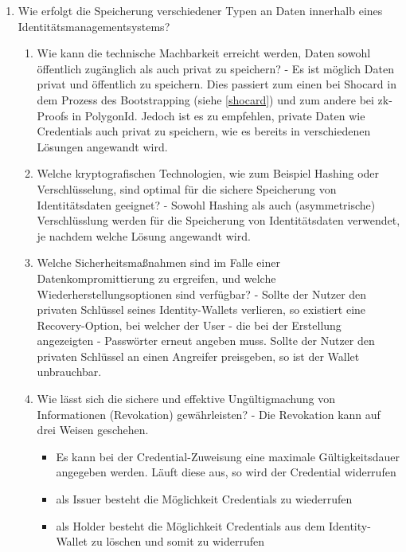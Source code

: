 \begin{enumerate}
	\item Wie erfolgt die Speicherung verschiedener Typen an Daten innerhalb eines Identitätsmanagementsystems?
	\begin{enumerate}
		\item Wie kann die technische Machbarkeit erreicht werden, Daten sowohl öffentlich zugänglich als auch privat zu speichern? - Es ist möglich Daten privat und öffentlich zu speichern. Dies passiert zum einen bei Shocard in dem Prozess des Bootstrapping (siehe \ref{shocard}) und zum andere bei zk-Proofs in PolygonId. Jedoch ist es zu empfehlen, private Daten wie Credentials auch privat zu speichern, wie es bereits in verschiedenen Lösungen angewandt wird.
		
		\item Welche kryptografischen Technologien, wie zum Beispiel Hashing oder Verschlüsselung, sind optimal für die sichere Speicherung von Identitätsdaten geeignet? - Sowohl Hashing als auch (asymmetrische) Verschlüsslung werden für die Speicherung von Identitätsdaten verwendet, je nachdem welche Lösung angewandt wird.
		
		 
		\item Welche Sicherheitsmaßnahmen sind im Falle einer Datenkompromittierung zu ergreifen, und welche Wiederherstellungsoptionen sind verfügbar? - Sollte der Nutzer den privaten Schlüssel seines Identity-Wallets verlieren, so existiert eine Recovery-Option, bei welcher der User - die bei der Erstellung angezeigten - Passwörter erneut angeben muss. Sollte der Nutzer den privaten Schlüssel an einen Angreifer preisgeben, so ist der Wallet unbrauchbar.
		
		\item Wie lässt sich die sichere und effektive Ungültigmachung von Informationen (Revokation) gewährleisten? - Die Revokation kann auf drei Weisen geschehen.
		
		\begin{itemize}
			
			\item Es kann bei der Credential-Zuweisung eine maximale Gültigkeitsdauer angegeben werden. Läuft diese aus, so wird der Credential widerrufen
			
			\item als Issuer besteht die Möglichkeit Credentials zu wiederrufen
			
			\item als Holder besteht die Möglichkeit Credentials aus dem Identity-Wallet zu löschen und somit zu widerrufen
			

\end{itemize}
\end{enumerate}
\end{enumerate}
